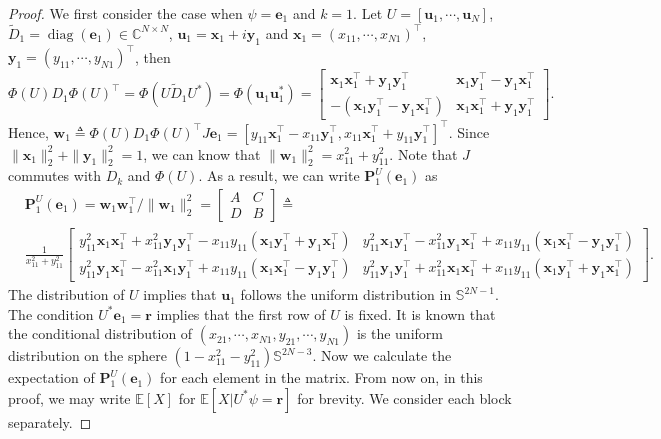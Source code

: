 \documentclass{amsart}
\theoremstyle{plain}
\theoremstyle{definition}
\theoremstyle{remark}
\newcommand{\CC}{\mathbb{C}}
\newcommand{\EE}{\mathbb{E}}
\begin{document}
\begin{proof}
    We first consider the case when $\psi=\bm e_1$ and $k=1$. Let $U=[\bm{u}_1,\cdots,\bm{u}_N]$, $\tilde D_1=\operatorname{diag}(\bm e_1)\in\CC^{N\times N}$, $\bm{u}_1=\bm{x}_1+i\bm{y}_1$ and $\bm{x}_1=(x_{11},\cdots,x_{N1})^\top$, $\bm{y}_1=(y_{11},\cdots,y_{N1})^\top$, then 
    \[\Phi(U)D_1\Phi(U)^\top=\Phi(U\tilde D_1U^*)=\Phi(\bm{u}_1\bm{u}_1^*)=\begin{bmatrix}
        \bm{x}_1\bm{x}_1^\top+\bm{y}_1\bm{y}_1^\top&\bm{x}_1\bm{y}_1^\top-\bm{y}_1\bm{x}_1^\top\\
        -(\bm{x}_1\bm{y}_1^\top-\bm{y}_1\bm{x}_1^\top)&\bm{x}_1\bm{x}_1^\top+\bm{y}_1\bm{y}_1^\top
    \end{bmatrix}.\]
    Hence, $\bm{w}_1\triangleq \Phi(U)D_1\Phi(U)^\top J\bm e_1=[y_{11}\bm{x}_1^\top-x_{11}\bm{y}_1^\top,x_{11}\bm{x}_1^\top+y_{11}\bm{y}_1^\top]^\top$. Since $\|\bm{x}_1\|_2^2+\|\bm{y}_1\|_2^2=1$, we can know that $\|\bm{w}_1\|_2^2=x_{11}^2+y_{11}^2$. Note that $J$ commutes with $D_k$ and $\Phi(U)$. As a result, we can write $\bm P_1^U(\bm e_1)$ as     
    \[\begin{aligned} 
    & \bm P_1^U(\bm e_1)=\bm w_1\bm w_1^\top/\|\bm w_1\|_2^2 = \begin{bmatrix} A & C \\ D & B \end{bmatrix} \triangleq
    \\
    & \frac{1}{x_{11}^2+y_{11}^2}\begin{bmatrix}  y_{11}^2\bm{x}_1\bm{x}_1^\top+x_{11}^2\bm{y}_1\bm{y}_1^\top-x_{11}y_{11}(\bm{x}_1\bm{y}_1^\top+\bm{y}_1\bm{x}_1^\top)&y_{11}^2\bm{x}_1\bm{y}_1^\top-x_{11}^2\bm{y}_1\bm{x}_1^\top+x_{11}y_{11}(\bm{x}_1\bm{x}_1^\top-\bm{y}_1\bm{y}_1^\top)\\
        y_{11}^2\bm{y}_1\bm{x}_1^\top-x_{11}^2\bm{x}_1\bm{y}_1^\top+x_{11}y_{11}(\bm{x}_1\bm{x}_1^\top-\bm{y}_1\bm{y}_1^\top)&y_{11}^2\bm{y}_1\bm{y}_1^\top+x_{11}^2\bm{x}_1\bm{x}_1^\top+x_{11}y_{11}(\bm{x}_1\bm{y}_1^\top+\bm{y}_1\bm{x}_1^\top)
    \end{bmatrix}.
    \end{aligned}\]
     The distribution of $U$ implies that  $\bm{u}_1$ follows the uniform distribution in $\mathbb S^{2N-1}$. The condition $U^*\bm e_1=\bm r$ implies that the first row of $U$ is fixed. It is known that the conditional distribution of $(x_{21},\cdots,x_{N1},y_{21},\cdots,y_{N1})$ is the uniform distribution on the sphere $(1-x_{11}^2-y_{11}^2)\mathbb S^{2N-3}$. Now we calculate the expectation of $\bm P_1^U(\bm e_1)$ for each element in the matrix. From now on, in this proof, we may write $\EE[X]$ for $\EE[X|U^*\psi=\bm r]$ for brevity. We consider each block separately.


\end{proof}
\end{document}
